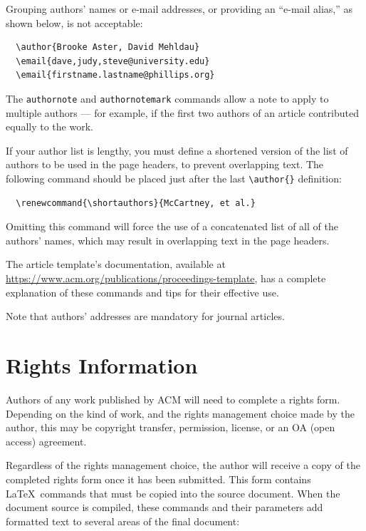 \documentclass[
acmsmall,
nonacm,
screen,
acmthm]{../templates/acmart}
\begin{document}
Grouping authors' names or e-mail addresses, or providing an ``e-mail
alias,'' as shown below, is not acceptable:

\begin{verbatim}
  \author{Brooke Aster, David Mehldau}
  \email{dave,judy,steve@university.edu}
  \email{firstname.lastname@phillips.org}
\end{verbatim}

The \texttt{authornote} and \texttt{authornotemark} commands allow a
note to apply to multiple authors --- for example, if the first two
authors of an article contributed equally to the work.

If your author list is lengthy, you must define a shortened version of
the list of authors to be used in the page headers, to prevent
overlapping text. The following command should be placed just after the
last \texttt{\textbackslash{}author\{\}} definition:

\begin{verbatim}
  \renewcommand{\shortauthors}{McCartney, et al.}
\end{verbatim}

Omitting this command will force the use of a concatenated list of all
of the authors' names, which may result in overlapping text in the page
headers.

The article template's documentation, available at
\url{https://www.acm.org/publications/proceedings-template}, has a
complete explanation of these commands and tips for their effective use.

Note that authors' addresses are mandatory for journal articles.

\hypertarget{rights-information}{%
\section{Rights Information}\label{rights-information}}

Authors of any work published by ACM will need to complete a rights
form. Depending on the kind of work, and the rights management choice
made by the author, this may be copyright transfer, permission, license,
or an OA (open access) agreement.

Regardless of the rights management choice, the author will receive a
copy of the completed rights form once it has been submitted. This form
contains LaTeX~commands that must be copied into the source document.
When the document source is compiled, these commands and their
parameters add formatted text to several areas of the final document:
\end{document}

